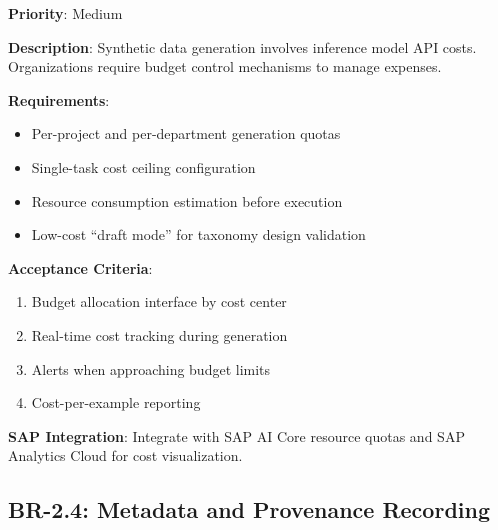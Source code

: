 \documentclass[12pt,a4paper,twoside]{report}
\begin{document}
\begin{tcolorbox}[colback=green!5,colframe=green!70,title=BR-2.3: Budget Control Mechanism]
\textbf{Priority}: Medium

\textbf{Description}: Synthetic data generation involves inference model API
costs. Organizations require budget control mechanisms to manage expenses.

\textbf{Requirements}:
\begin{itemize}
\item Per-project and per-department generation quotas
\item Single-task cost ceiling configuration
\item Resource consumption estimation before execution
\item Low-cost ``draft mode'' for taxonomy design validation
\end{itemize}

\textbf{Acceptance Criteria}:
\begin{enumerate}
\item Budget allocation interface by cost center
\item Real-time cost tracking during generation
\item Alerts when approaching budget limits
\item Cost-per-example reporting
\end{enumerate}

\textbf{SAP Integration}: Integrate with SAP AI Core resource quotas and
SAP Analytics Cloud for cost visualization.
\end{tcolorbox}

\subsection{BR-2.4: Metadata and Provenance Recording}
\end{document}
